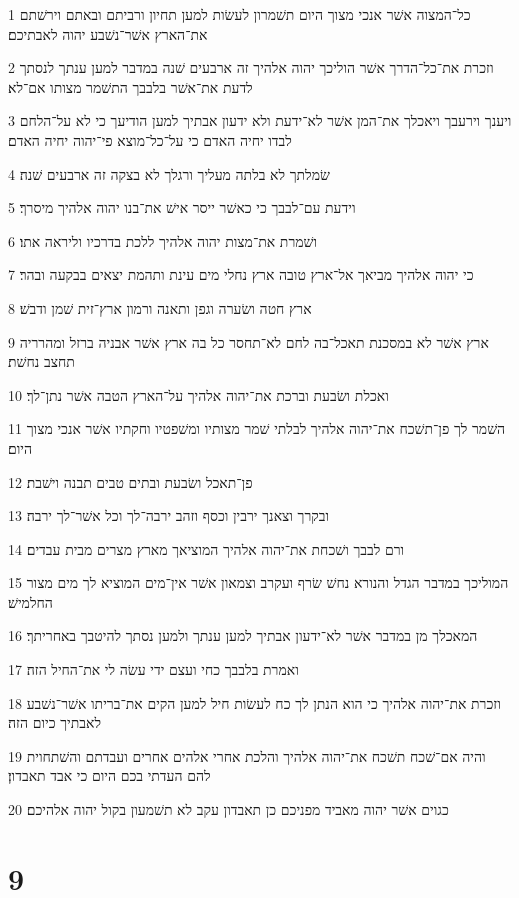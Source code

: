 \par 1 כל־המצוה אשׁר אנכי מצוך היום תשׁמרון לעשׂות למען תחיון ורביתם ובאתם וירשׁתם את־הארץ אשׁר־נשׁבע יהוה לאבתיכם׃
\par 2 וזכרת את־כל־הדרך אשׁר הוליכך יהוה אלהיך זה ארבעים שׁנה במדבר למען ענתך לנסתך לדעת את־אשׁר בלבבך התשׁמר מצותו אם־לא׃
\par 3 ויענך וירעבך ויאכלך את־המן אשׁר לא־ידעת ולא ידעון אבתיך למען הודיעך כי לא על־הלחם לבדו יחיה האדם כי על־כל־מוצא פי־יהוה יחיה האדם׃
\par 4 שׂמלתך לא בלתה מעליך ורגלך לא בצקה זה ארבעים שׁנה׃
\par 5 וידעת עם־לבבך כי כאשׁר ייסר אישׁ את־בנו יהוה אלהיך מיסרך׃
\par 6 ושׁמרת את־מצות יהוה אלהיך ללכת בדרכיו וליראה אתו׃
\par 7 כי יהוה אלהיך מביאך אל־ארץ טובה ארץ נחלי מים עינת ותהמת יצאים בבקעה ובהר׃
\par 8 ארץ חטה ושׂערה וגפן ותאנה ורמון ארץ־זית שׁמן ודבשׁ׃
\par 9 ארץ אשׁר לא במסכנת תאכל־בה לחם לא־תחסר כל בה ארץ אשׁר אבניה ברזל ומהרריה תחצב נחשׁת׃
\par 10 ואכלת ושׂבעת וברכת את־יהוה אלהיך על־הארץ הטבה אשׁר נתן־לך׃
\par 11 השׁמר לך פן־תשׁכח את־יהוה אלהיך לבלתי שׁמר מצותיו ומשׁפטיו וחקתיו אשׁר אנכי מצוך היום׃
\par 12 פן־תאכל ושׂבעת ובתים טבים תבנה וישׁבת׃
\par 13 ובקרך וצאנך ירבין וכסף וזהב ירבה־לך וכל אשׁר־לך ירבה׃
\par 14 ורם לבבך ושׁכחת את־יהוה אלהיך המוציאך מארץ מצרים מבית עבדים׃
\par 15 המוליכך במדבר הגדל והנורא נחשׁ שׂרף ועקרב וצמאון אשׁר אין־מים המוציא לך מים מצור החלמישׁ׃
\par 16 המאכלך מן במדבר אשׁר לא־ידעון אבתיך למען ענתך ולמען נסתך להיטבך באחריתך׃
\par 17 ואמרת בלבבך כחי ועצם ידי עשׂה לי את־החיל הזה׃
\par 18 וזכרת את־יהוה אלהיך כי הוא הנתן לך כח לעשׂות חיל למען הקים את־בריתו אשׁר־נשׁבע לאבתיך כיום הזה׃
\par 19 והיה אם־שׁכח תשׁכח את־יהוה אלהיך והלכת אחרי אלהים אחרים ועבדתם והשׁתחוית להם העדתי בכם היום כי אבד תאבדון׃
\par 20 כגוים אשׁר יהוה מאביד מפניכם כן תאבדון עקב לא תשׁמעון בקול יהוה אלהיכם׃

\chapter{9}

